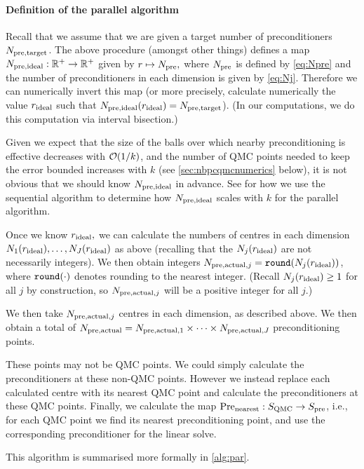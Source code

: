    \paragraph{Definition of the parallel algorithm} Recall that we assume that we are given a target number of preconditioners $N_{\mathrm{pre,target}}$. The above procedure (amongst other things) defines a map $N_{\mathrm{pre,ideal}}:\mathbb R^{+} \rightarrow \mathbb R^{+}$ given by $r \mapsto N_{\mathrm{pre}},$ where $N_{\mathrm{pre}}$ is defined by \cref{eq:Npre} and the number of preconditioners in each dimension is given by \cref{eq:Nj}.  Therefore we can numerically invert this map (or more precisely, calculate numerically the value $r_{\mathrm{ideal}}$ such that $N_{\mathrm{pre,ideal}}(r_{\mathrm{ideal}}) = N_{\mathrm{pre,target}}$). (In our computations, we do this computation via interval bisection.)

Given we expect that the size of the balls over which nearby preconditioning is effective decreases with $\cO\mleft(1/k\mright)$, and the number of QMC points needed to keep the error bounded increases with $k$ (see \cref{sec:nbpcqmcnumerics} below), it is not obvious that we should know $N_{\mathrm{pre,ideal}}$ in advance. See  for how we use the sequential algorithm to determine how $N_{\mathrm{pre,ideal}}$ scales with $k$ for the parallel algorithm.

    Once we know $r_{\mathrm{ideal}},$ we can calculate the numbers of centres in each dimension $N_{1}(r_{\mathrm{ideal}}),\ldots,N_{J}(r_{\mathrm{ideal}})$ as above (recalling that the $N_{j}(r_{\mathrm{ideal}})$ are not necessarily integers). We then obtain integers $\Npreactualj = \round{\Nj(\rideal)}$, where $\round{\cdot}$ denotes rounding to the nearest integer. (Recall $N_{j}(r_{\mathrm{ideal}}) \geq 1$ for all $j$ by construction, so $N_{\mathrm{pre,actual},j}$ will be a positive integer for all $j.$)

We then take $N_{\mathrm{pre,actual},j}$ centres in each dimension, as described above. We then obtain a total of $N_{\mathrm{pre,actual}} = N_{\mathrm{pre,actual},1} \times \cdots \times N_{\mathrm{pre,actual},J}$ preconditioning points.

These points may not be QMC points. We could simply calculate the preconditioners at these non-QMC points. However we instead replace each calculated centre with its nearest QMC point and calculate the preconditioners at these QMC points. Finally, we calculate the map $\mathrm{Pre}_{\mathrm{nearest}}:S_{\mathrm{QMC}}\rightarrow S_{\mathrm{pre}}$, i.e., for each QMC point we find its nearest preconditioning point, and use the corresponding preconditioner for the linear solve.

    This algorithm is summarised more formally in \cref{alg:par}.
    

